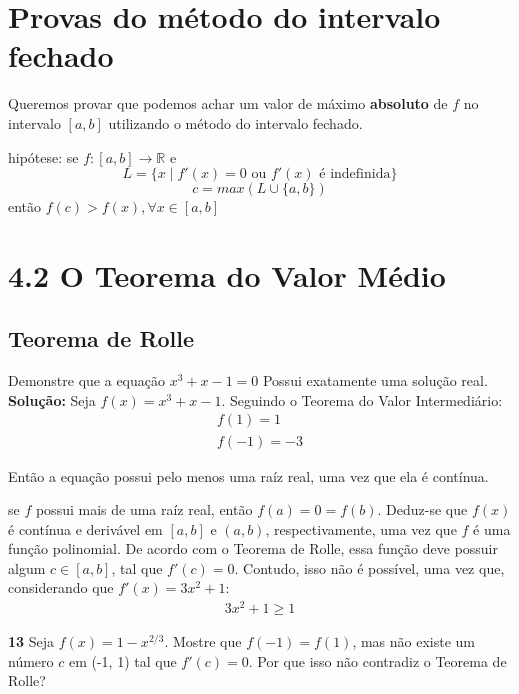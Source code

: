 \section{Provas do método do intervalo fechado}
Queremos provar que podemos achar um valor de máximo \textbf{absoluto} de $f$ no intervalo $[a, b]$ utilizando o método do intervalo fechado.

hipótese: se $f: [a,b] \longrightarrow \mathbb{R} $ e $$L = \{x \mid f'(x) = 0 \text{ ou } f'(x) \text{ é indefinida}\}$$
\begin{equation}
        c=max(L \cup \{a, b\})
\end{equation}
então $f(c) > f(x), \forall x \in [a,b]$

\section{4.2 O Teorema do Valor Médio}
\subsection{Teorema de Rolle}
Demonstre que a equação $x^3 + x - 1 = 0$ Possui exatamente uma solução real.
\textbf{Solução:}
Seja $f(x) = x^3 + x - 1$.
Seguindo o Teorema do Valor Intermediário:
\begin{equation}
    \begin{split}
        f(1) = 1 \\
        f(-1) = -3
    \end{split}
\end{equation}

Então a equação possui pelo menos uma raíz real, uma vez que ela é contínua.

se $f$ possui mais de uma raíz real, então $f(a)=0=f(b)$. Deduz-se que $f(x)$ é contínua e derivável em $[a,b]$ e $(a,b)$, respectivamente, uma vez que $f$ é uma função polinomial. De acordo com o Teorema de Rolle, essa função deve possuir algum $c \in [a,b]$, tal que $f'(c)=0$. Contudo, isso não é possível, uma vez que, considerando que $f'(x) = 3x^2 + 1$:
\begin{equation}
    \begin{split}
        3x^2 + 1 \geq 1
    \end{split}
\end{equation}

\textbf{13} Seja $f(x) = 1 - x^{2/3}$. Mostre que $f(-1)=f(1)$, mas não existe um número $c$ em (-1, 1) tal que $f'(c)=0$. Por que isso não contradiz o Teorema de Rolle?

